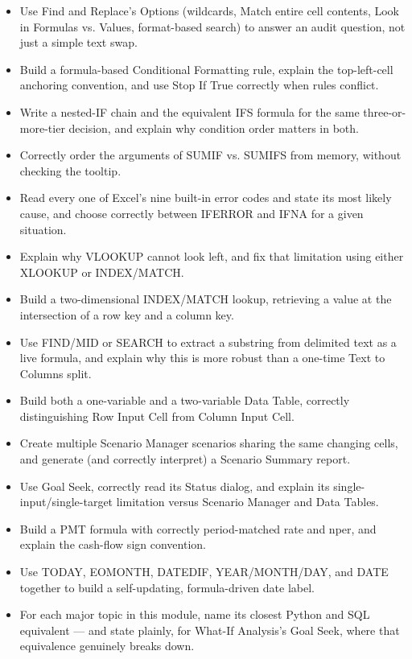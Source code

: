 \documentclass[11pt,a4paper]{article}
\begin{document}
\begin{itemize}
  \item[$\square$] Use Find and Replace's Options (wildcards, Match entire cell contents, Look in Formulas vs. Values, format-based search) to answer an audit question, not just a simple text swap.
  \item[$\square$] Build a formula-based Conditional Formatting rule, explain the top-left-cell anchoring convention, and use Stop If True correctly when rules conflict.
  \item[$\square$] Write a nested-IF chain and the equivalent IFS formula for the same three-or-more-tier decision, and explain why condition order matters in both.
  \item[$\square$] Correctly order the arguments of SUMIF vs. SUMIFS from memory, without checking the tooltip.
  \item[$\square$] Read every one of Excel's nine built-in error codes and state its most likely cause, and choose correctly between IFERROR and IFNA for a given situation.
  \item[$\square$] Explain why VLOOKUP cannot look left, and fix that limitation using either XLOOKUP or INDEX/MATCH.
  \item[$\square$] Build a two-dimensional INDEX/MATCH lookup, retrieving a value at the intersection of a row key and a column key.
  \item[$\square$] Use FIND/MID or SEARCH to extract a substring from delimited text as a live formula, and explain why this is more robust than a one-time Text to Columns split.
  \item[$\square$] Build both a one-variable and a two-variable Data Table, correctly distinguishing Row Input Cell from Column Input Cell.
  \item[$\square$] Create multiple Scenario Manager scenarios sharing the same changing cells, and generate (and correctly interpret) a Scenario Summary report.
  \item[$\square$] Use Goal Seek, correctly read its Status dialog, and explain its single-input/single-target limitation versus Scenario Manager and Data Tables.
  \item[$\square$] Build a PMT formula with correctly period-matched rate and nper, and explain the cash-flow sign convention.
  \item[$\square$] Use TODAY, EOMONTH, DATEDIF, YEAR/MONTH/DAY, and DATE together to build a self-updating, formula-driven date label.
  \item[$\square$] For each major topic in this module, name its closest Python and SQL equivalent --- and state plainly, for What-If Analysis's Goal Seek, where that equivalence genuinely breaks down.
\end{itemize}
\end{document}
